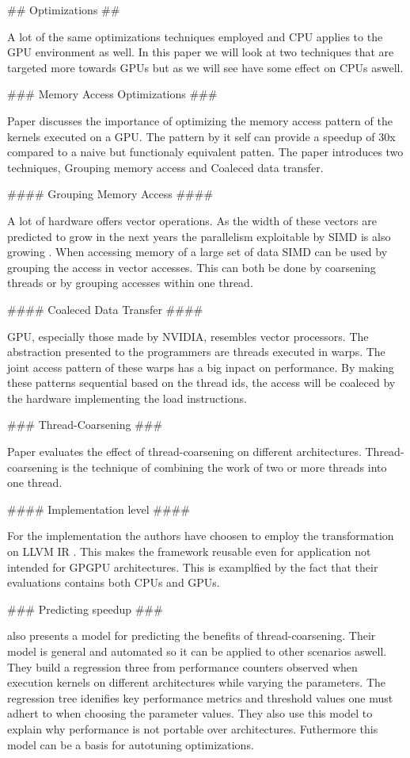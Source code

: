 \begin{markdown}

## Optimizations ##

A lot of the same optimizations techniques employed and CPU applies to
the GPU environment as well. In this paper we will look at two
techniques that are targeted more towards GPUs but as we will see have
some effect on CPUs aswell. 

### Memory Access Optimizations ###

Paper \cite{mem-acc} discusses the importance of optimizing the memory
access pattern of the kernels executed on a GPU. The pattern by it
self can provide a speedup of 30x compared to a naive but functionaly
equivalent patten. The paper introduces two techniques, Grouping
memory access and Coaleced data transfer.

#### Grouping Memory Access ####

A lot of hardware offers vector operations. As the width of these
vectors are predicted to grow in the next years the parallelism
exploitable by SIMD is also growing \cite{Hennessy}. When accessing
memory of a large set of data SIMD can be used by grouping the access
in vector accesses. This can both be done by coarsening threads or by
grouping accesses within one thread.

#### Coaleced Data Transfer ####

GPU, especially those made by NVIDIA, resembles vector processors. The
abstraction presented to the programmers are threads executed in
warps. The joint access pattern of these warps has a big inpact on
performance. By making these patterns sequential based on the thread
ids, the access will be coaleced by the hardware implementing the load
instructions.

### Thread-Coarsening ###

Paper \cite{thd-coa} evaluates the effect of thread-coarsening on
different architectures. Thread-coarsening is the technique of
combining the work of two or more threads into one thread.

#### Implementation level ####

For the implementation the authors have choosen to employ the
transformation on LLVM IR \cite{LLVM}. This makes the framework
reusable even for application not intended for GPGPU
architectures. This is examplfied by the fact that their evaluations
contains both CPUs and GPUs.

### Predicting speedup ###

\cite{thd-coa} also presents a model for predicting the benefits of
thread-coarsening. Their model is general and automated so it can be
applied to other scenarios aswell. They build a regression three from
performance counters observed when execution kernels on different
architectures while varying the parameters. The regression tree
idenifies key performance metrics and threshold values one must adhert
to when choosing the parameter values. They also use this model to
explain why performance is not portable over architectures. Futhermore
this model can be a basis for autotuning optimizations. 

\end{markdown}


